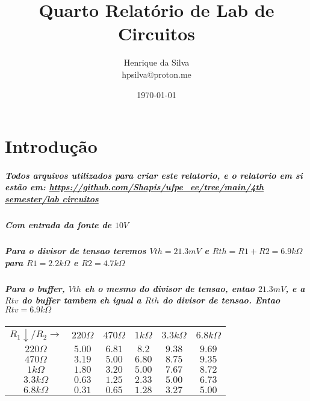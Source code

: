 \documentclass[12pt,twoside, a4paper, twocolumn]{article}
\title{Quarto Relatório de Lab de Circuitos}
\author{Henrique da Silva \\ hpsilva@proton.me}
\date{\today}
\begin{document}
\maketitle
{}
\newpage
\tableofcontents
\newpage



\section{Introdução}


\subparagraph*{Todos arquivos utilizados para criar este relatorio, e o relatorio em si estão em:  \url{https://github.com/Shapis/ufpe_ee/tree/main/4th semester/lab circuitos}}

\subparagraph*{Com entrada da fonte de $10V$}

\subparagraph*{Para o divisor de tensao teremos $Vth = 21.3mV$ e $Rth = R1+R2 = 6.9k\varOmega$ para $R1 = 2.2k\varOmega$ e $R2 = 4.7k\varOmega$}

\subparagraph*{Para o buffer, $Vth$ eh o mesmo do divisor de tensao, entao $21.3mV$, e a $Rtv$ do buffer tambem eh igual a $Rth$ do divisor de tensao. Entao $Rtv = 6.9k\varOmega$}


\begin{center}
    \begin{tabular}{ |c|ccccc| }
        \hline
        $R_1 \downarrow / R_2 \rightarrow $ & $220\varOmega$ & $470\varOmega$ & $1k\varOmega$ & $3.3k\varOmega$ & $6.8k\varOmega$ \\
        $220\varOmega$                      & $5.00$         & $6.81$         & $8.2$         & $9.38$          & $9.69$          \\
        $470\varOmega$                      & $3.19$         & $5.00$         & $6.80$        & $8.75$          & $9.35$          \\
        $1k\varOmega$                       & $1.80$         & $3.20$         & $5.00$        & $7.67$          & $8.72$          \\
        $3.3k\varOmega$                     & $0.63$         & $1.25$         & $2.33$        & $5.00$          & $6.73$          \\
        $6.8k\varOmega$                     & $0.31$         & $0.65$         & $1.28$        & $3.27$          & $5.00$          \\
        \hline
    \end{tabular}
\end{center}
\end{document}
